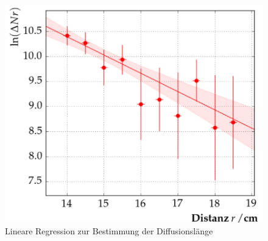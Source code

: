 \begin{figure}[tb]
  \centering
  \includegraphics[scale=0.5]{./fig/plot3.png}
  \caption{Lineare Regression zur Bestimmung der Diffusionslänge}
  \label{fig:plot3}
\end{figure}

